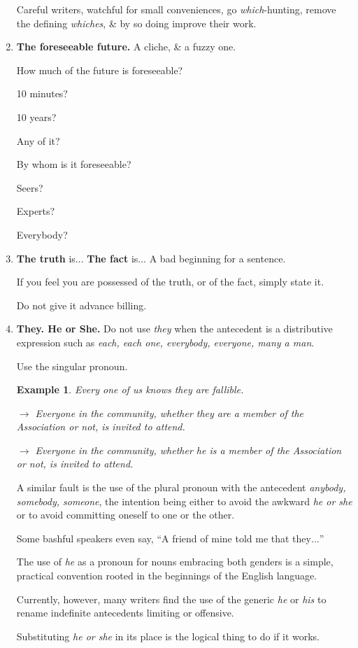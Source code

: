 \documentclass{article}
\newtheorem{example}{Example}
\begin{document}
\begin{enumerate}
	Careful writers, watchful for small conveniences, go {\it which}-hunting, remove the defining {\it whiches}, \& by so doing improve their work.
	\item {\bf The foreseeable future.} A cliche, \& a fuzzy one.
	
	How much of the future is foreseeable?
	
	10 minutes?
	
	10 years?
	
	Any of it?
	
	By whom is it foreseeable?
	
	Seers?
	
	Experts?
	
	Everybody?
	\item {\bf The truth} is$\ldots$ {\bf The fact} is$\ldots$ A bad beginning for a sentence.
	
	If you feel you are possessed of the truth, or of the fact, simply state it.
	
	Do not give it advance billing.
	\item {\bf They. He or She.} Do not use {\it they} when the antecedent is a distributive expression such as {\it each, each one, everybody, everyone, many a man}.
	
	Use the singular pronoun.
	\begin{example}
		Every one of us knows they are fallible.
		
		$\to$ Everyone in the community, whether they are a member of the Association or not, is invited to attend.
		
		$\to$ Everyone in the community, whether he is a member of the Association or not, is invited to attend.
	\end{example}
	A similar fault is the use of the plural pronoun with the antecedent {\it anybody, somebody, someone}, the intention being either to avoid the awkward {\it he or she} or to avoid committing oneself to one or the other.
	
	Some bashful speakers even say, ``A friend of mine told me that they$\ldots$''
	
	The use of {\it he} as a pronoun for nouns embracing both genders is a simple, practical convention rooted in the beginnings of the English language.
	
	Currently, however, many writers find the use of the generic {\it he} or {\it his} to rename indefinite antecedents limiting or offensive.
	
	Substituting {\it he or she} in its place is the logical thing to do if it works.
	

\end{enumerate}
\end{document}
